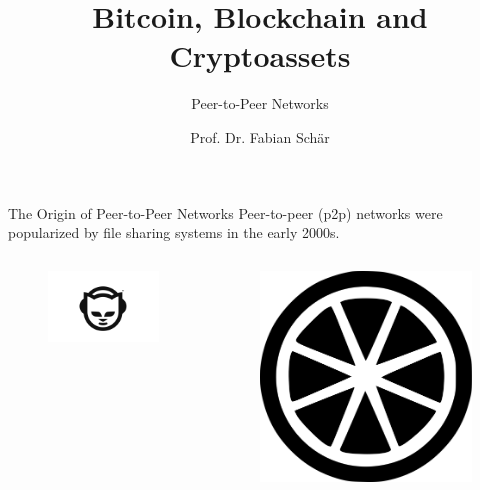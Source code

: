 \documentclass[]{beamer}
\title{Bitcoin, Blockchain and Cryptoassets}
\subtitle{Peer-to-Peer Networks}
\author{Prof. Dr. Fabian Schär}
\institute{University of Basel}
\begin{document}
\thispagestyle{empty}
\begin{frame}[noframenumbering]
	\titlepage
\end{frame}

\begin{frame}{The Origin of Peer-to-Peer Networks}
	Peer-to-peer (p2p) networks were popularized by file sharing systems in the early 2000s.
	\begin{columns}
		\begin{column}{0.5\textwidth}
			\begin{figure}
				\begin{center}
					\includegraphics[height = 0.25\textheight]{../assets/images/napster}
				\end{center}
			\end{figure}
		\end{column}
		\begin{column}{0.5\textwidth}
			\begin{figure}
				\begin{center}
					\includegraphics[height = 0.16\textheight]{../assets/images/limewire}

\end{center}
\end{figure}
\end{column}
\end{columns}
\end{frame}
\end{document}
